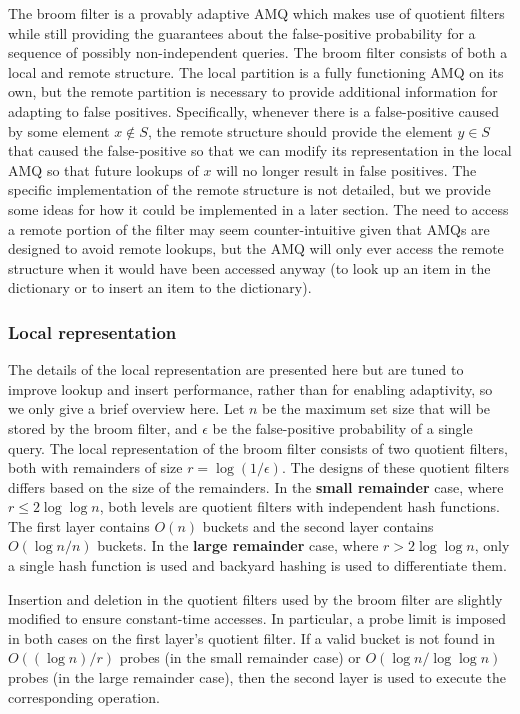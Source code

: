 \documentclass[../paper.tex]{subfiles}
\begin{document}
The broom filter is a provably adaptive AMQ which makes use of quotient filters
while still providing the guarantees about the false-positive probability for
a sequence of possibly non-independent queries. The broom filter consists
of both a local and remote structure. The local partition is a fully functioning
AMQ on its own, but the remote partition is necessary to provide additional
information for adapting to false positives. Specifically, whenever there is
a false-positive caused by some element $x \notin S$, the remote structure
should provide the element $y \in S$ that caused the false-positive so
that we can modify its representation in the local AMQ so that future lookups
of $x$ will no longer result in false positives. The specific implementation
of the remote structure is not detailed, but we provide some ideas for
how it could be implemented in a later section. The need to access a remote
portion of the filter may seem counter-intuitive given that AMQs are designed
to avoid remote lookups, but the AMQ will only ever access the remote structure
when it would have been accessed anyway (to look up an item in the dictionary or
to insert an item to the dictionary).

\subsubsection{Local representation}

The details of the local representation are presented here but are tuned to
improve lookup and insert performance, rather than for enabling adaptivity,
so we only give a brief overview here.
Let $n$ be the maximum set size that will be stored by the broom filter, and $\epsilon$
be the false-positive probability of a single query.
The local representation of the broom filter consists of two quotient filters, both
with remainders of size $r=\log(1/\epsilon)$. The designs of these quotient filters
differs based on the size of the remainders. In the \textbf{small remainder} case,
where $r \leq 2 \log \log n$, both levels are quotient filters with independent hash
functions. The first layer contains $O(n)$ buckets and the second layer contains
$O(\log n/n)$ buckets. In the \textbf{large remainder} case, where $r > 2 \log \log n$,
only a single hash function is used and backyard hashing \cite{backyard-hashing} is used
to differentiate them.

Insertion and deletion in the quotient filters used by the broom filter are slightly modified to ensure constant-time
accesses. In particular, a probe limit is imposed in both cases on the first layer's quotient filter.
If a valid bucket is not found in $O((\log n)/r)$ probes (in the small remainder case) or $O(\log n / \log \log n)$
probes (in the large remainder case), then the second layer is used to execute the corresponding operation.
\end{document}
